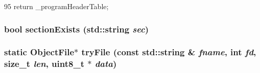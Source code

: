 \begin{DoxyCode}
95 {return _programHeaderTable;}
\end{DoxyCode}
\hypertarget{classElfObject_a5eb8917b5bb77054582ad80b5668e68e}{
\subsubsection[{sectionExists}]{\setlength{\rightskip}{0pt plus 5cm}bool sectionExists (std::string {\em sec})}}
\label{classElfObject_a5eb8917b5bb77054582ad80b5668e68e}
\hypertarget{classElfObject_af96c4ced69d653731f78ba9d9006e251}{
\subsubsection[{tryFile}]{\setlength{\rightskip}{0pt plus 5cm}static {\bf ObjectFile}$\ast$ tryFile (const std::string \& {\em fname}, \/  int {\em fd}, \/  size\_\-t {\em len}, \/  uint8\_\-t $\ast$ {\em data})}}
\label{classElfObject_af96c4ced69d653731f78ba9d9006e251}


